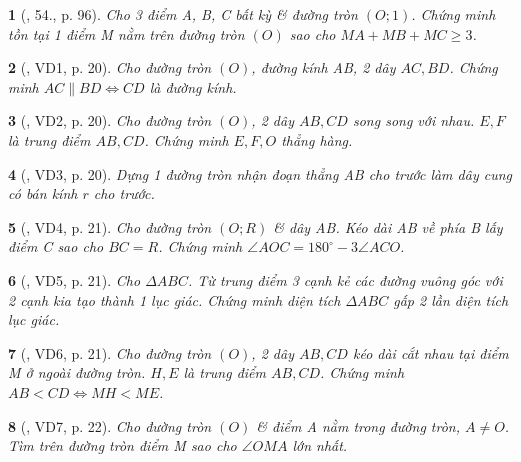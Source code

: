 \documentclass{article}
\newtheorem{baitoan}{}
\begin{document}
\begin{baitoan}[\cite{Binh_Toan_9_tap_1}, 54., p. 96]
	Cho 3 điểm A, B, C bất kỳ \& đường tròn $(O;1)$. Chứng minh tồn tại 1 điểm M nằm trên đường tròn $(O)$ sao cho $MA + MB + MC\ge3$.
\end{baitoan}

\begin{baitoan}[\cite{TLCT_THCS_Toan_9_hinh_hoc}, VD1, p. 20]
	Cho đường tròn $(O)$, đường kính AB, 2 dây $AC,BD$. Chứng minh $AC\parallel BD\Leftrightarrow CD$ là đường kính.
\end{baitoan}

\begin{baitoan}[\cite{TLCT_THCS_Toan_9_hinh_hoc}, VD2, p. 20]
	Cho đường tròn $(O)$, 2 dây $AB,CD$ song song với nhau. $E,F$ là trung điểm $AB,CD$. Chứng minh $E,F,O$ thẳng hàng.
\end{baitoan}

\begin{baitoan}[\cite{TLCT_THCS_Toan_9_hinh_hoc}, VD3, p. 20]
	Dựng 1 đường tròn nhận đoạn thẳng AB cho trước làm dây cung có bán kính $r$ cho trước.
\end{baitoan}

\begin{baitoan}[\cite{TLCT_THCS_Toan_9_hinh_hoc}, VD4, p. 21]
	Cho đường tròn $(O;R)$ \& dây AB. Kéo dài AB về phía B lấy điểm C sao cho $BC = R$. Chứng minh $\angle{AOC} = 180^\circ - 3\angle{ACO}$.
\end{baitoan}

\begin{baitoan}[\cite{TLCT_THCS_Toan_9_hinh_hoc}, VD5, p. 21]
	Cho $\Delta ABC$. Từ trung điểm 3 cạnh kẻ các đường vuông góc với 2 cạnh kia tạo thành 1 lục giác. Chứng minh diện tích $\Delta ABC$ gấp 2 lần diện tích lục giác.
\end{baitoan}

\begin{baitoan}[\cite{TLCT_THCS_Toan_9_hinh_hoc}, VD6, p. 21]
	Cho đường tròn $(O)$, 2 dây $AB,CD$ kéo dài cắt nhau tại điểm M ở ngoài đường tròn. $H,E$ là trung điểm $AB,CD$. Chứng minh $AB < CD\Leftrightarrow MH < ME$.
\end{baitoan}

\begin{baitoan}[\cite{TLCT_THCS_Toan_9_hinh_hoc}, VD7, p. 22]
	Cho đường tròn $(O)$ \& điểm A nằm trong đường tròn, $A\ne O$. Tìm trên đường tròn điểm M sao cho $\angle{OMA}$ lớn nhất.
\end{baitoan}
\end{document}
